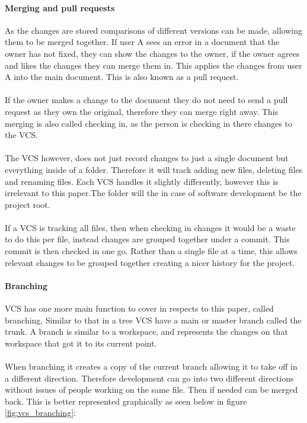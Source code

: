 \paragraph{Merging and pull requests}
As the changes are stored comparisons of different versions can be made, allowing them to be merged together. If user A sees an error in a document that the owner has not fixed, they can show the changes to the owner, if the owner agrees and likes the changes they can merge them in. This applies the changes from user A into the main document. This is also known as a pull request.
\\\\
If the owner makes a change to the document they do not need to send a pull request as they own the original, therefore they can merge right away. This merging is also called checking in, as the person is checking in there changes to the VCS.
\\\\
The VCS however, does not just record changes to just a single document but everything inside of a folder. Therefore it will track adding new files, deleting files and renaming files. Each VCS handles it slightly differently, however this is irrelevant to this paper.The folder will the in case of software development be the project root.
\\\\
If a VCS is tracking all files, then when checking in changes it would be a waste to do this per file, instead changes are grouped together under a commit. This commit is then checked in one go. Rather than a single file at a time, this allows relevant changes to be grouped together creating a nicer history for the project.

\paragraph{Branching}
VCS has one more main function to cover in respects to this paper, called branching. Similar to that in a tree VCS have a main or master branch called the trunk. A branch is similar to a workspace, and represents the changes on that workspace that got it to its current point.
\\\\
When branching it creates a copy of the current branch allowing it to take off in a different direction. Therefore development can go into two different directions without issues of people working on the same file. Then if needed can be merged back. This is better represented graphically as seen below in figure \ref{fig:vcs_branching}:


